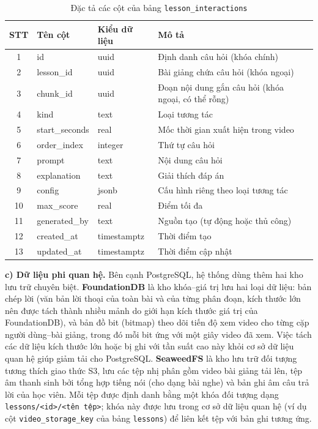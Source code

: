 \documentclass[../DoAn.tex]{subfiles}
\begin{document}
\begin{table}[H]
\centering
\begin{tabular}{|c|l|l|p{5.8cm}|}
\hline
\textbf{STT} & \textbf{Tên cột} & \textbf{Kiểu dữ liệu} & \textbf{Mô tả} \\ \hline
1 & id & uuid & Định danh câu hỏi (khóa chính) \\ \hline
2 & lesson\_id & uuid & Bài giảng chứa câu hỏi (khóa ngoại) \\ \hline
3 & chunk\_id & uuid & Đoạn nội dung gắn câu hỏi (khóa ngoại, có thể rỗng) \\ \hline
4 & kind & text & Loại tương tác \\ \hline
5 & start\_seconds & real & Mốc thời gian xuất hiện trong video \\ \hline
6 & order\_index & integer & Thứ tự câu hỏi \\ \hline
7 & prompt & text & Nội dung câu hỏi \\ \hline
8 & explanation & text & Giải thích đáp án \\ \hline
9 & config & jsonb & Cấu hình riêng theo loại tương tác \\ \hline
10 & max\_score & real & Điểm tối đa \\ \hline
11 & generated\_by & text & Nguồn tạo (tự động hoặc thủ công) \\ \hline
12 & created\_at & timestamptz & Thời điểm tạo \\ \hline
13 & updated\_at & timestamptz & Thời điểm cập nhật \\ \hline
\end{tabular}
\caption{Đặc tả các cột của bảng \texttt{lesson\_interactions}}
\label{tbl:interactions}
\end{table}

\textbf{c) Dữ liệu phi quan hệ.} Bên cạnh PostgreSQL, hệ thống dùng thêm hai kho lưu trữ chuyên biệt. \textbf{FoundationDB} là kho khóa--giá trị lưu hai loại dữ liệu: bản chép lời (văn bản lời thoại của toàn bài và của từng phân đoạn, kích thước lớn nên được tách thành nhiều mảnh do giới hạn kích thước giá trị của FoundationDB), và bản đồ bit (bitmap) theo dõi tiến độ xem video cho từng cặp người dùng--bài giảng, trong đó mỗi bit ứng với một giây video đã xem. Việc tách các dữ liệu kích thước lớn hoặc bị ghi với tần suất cao này khỏi cơ sở dữ liệu quan hệ giúp giảm tải cho PostgreSQL. \textbf{SeaweedFS} là kho lưu trữ đối tượng tương thích giao thức S3, lưu các tệp nhị phân gồm video bài giảng tải lên, tệp âm thanh sinh bởi tổng hợp tiếng nói (cho dạng bài nghe) và bản ghi âm câu trả lời của học viên. Mỗi tệp được định danh bằng một khóa đối tượng dạng \texttt{lessons/<id>/<tên tệp>}; khóa này được lưu trong cơ sở dữ liệu quan hệ (ví dụ cột \texttt{video\_storage\_key} của bảng \texttt{lessons}) để liên kết tệp với bản ghi tương ứng.
\end{document}
